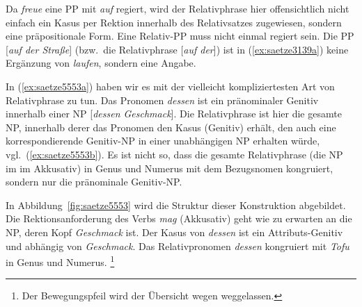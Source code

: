 \begin{exe}
  \ex\label{ex:saetze5552} 
    \begin{xlist}
    \end{xlist} 
\end{exe}

Da \textit{freue} eine PP mit \textit{auf} regiert, wird der Relativphrase hier offensichtlich nicht einfach ein Kasus per Rektion innerhalb des Relativsatzes zugewiesen, sondern eine präpositionale Form.
Eine Relativ-PP muss nicht einmal regiert sein.
Die PP [\textit{auf der Straße}] (bzw.\ die Relativphrase [\textit{auf der}]) ist  in (\ref{ex:saetze3139a}) keine Ergänzung von \textit{laufen}, sondern eine Angabe.

\begin{exe}
  \ex\label{ex:saetze3139}
  \begin{xlist}
  \end{xlist}
\end{exe}

In (\ref{ex:saetze5553a}) haben wir es mit der vielleicht kompliziertesten Art von Relativphrase zu tun.
Das Pronomen \textit{dessen} ist ein pränominaler Genitiv innerhalb einer NP [\textit{dessen Geschmack}].
Die Relativphrase ist hier die gesamte NP, innerhalb derer das Pronomen den Kasus (Genitiv) erhält, den auch eine korrespondierende Genitiv-NP in einer unabhängigen NP erhalten würde, vgl.\ (\ref{ex:saetze5553b}).
Es ist nicht so, dass die gesamte Relativphrase (die NP im im Akkusativ) in Genus und Numerus mit dem Bezugsnomen kongruiert, sondern nur die pränominale Genitiv-NP.

\begin{exe}
  \ex\label{ex:saetze5553} 
    \begin{xlist}
    \end{xlist}
\end{exe}


In Abbildung~\ref{fig:saetze5553} wird die Struktur dieser Konstruktion abgebildet.
Die Rektionsanforderung des Verbs \textit{mag} (Akkusativ) geht wie zu erwarten an die NP, deren Kopf \textit{Geschmack} ist.
Der Kasus von \textit{dessen} ist ein Attributs-Genitiv und abhängig von \textit{Geschmack}.
Das Relativpronomen \textit{dessen} kongruiert mit \textit{Tofu} in Genus und Numerus.%
\footnote{Der Bewegungspfeil wird der Übersicht wegen weggelassen.}

